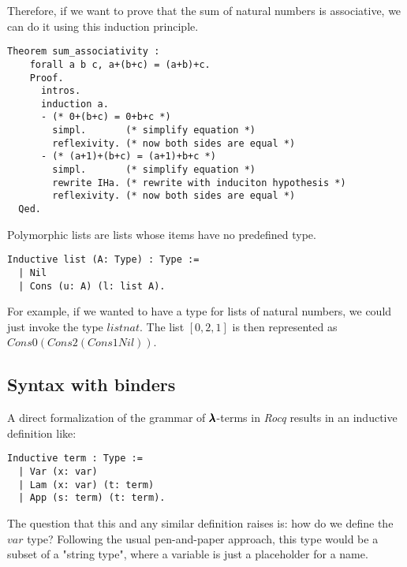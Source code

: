 Therefore, if we want to prove that the sum of natural numbers is associative, we can do it using this induction principle.
\begin{lstlisting}[language=Coq]
  Theorem sum_associativity :
    forall a b c, a+(b+c) = (a+b)+c.
    Proof.
      intros.
      induction a.
      - (* 0+(b+c) = 0+b+c *)
        simpl.       (* simplify equation *)
        reflexivity. (* now both sides are equal *)        
      - (* (a+1)+(b+c) = (a+1)+b+c *)
        simpl.       (* simplify equation *)
        rewrite IHa. (* rewrite with induciton hypothesis *)
        reflexivity. (* now both sides are equal *)
  Qed.
\end{lstlisting}

Polymorphic lists are lists whose items have no predefined type.
\begin{lstlisting}[language=Coq]
  Inductive list (A: Type) : Type :=
  | Nil
  | Cons (u: A) (l: list A).
\end{lstlisting}

For example, if we wanted to have a type for lists of natural numbers, we could just invoke the type \lst$list nat$. The list \lst$[0,2,1]$ is then represented as \lst$Cons 0 (Cons 2 (Cons 1 Nil))$.




\subsection{Syntax with binders}

A direct formalization of the grammar of $\pmb{\lambda}$-terms in \textit{Rocq} results in an inductive definition like:
\begin{lstlisting}[language=Coq]
  Inductive term : Type :=
  | Var (x: var)
  | Lam (x: var) (t: term)
  | App (s: term) (t: term).
\end{lstlisting}

The question that this and any similar definition raises is: how do we define the \lst$var$ type? Following the usual pen-and-paper approach, this type would be a subset of a "string type", where a variable is just a placeholder for a name.

